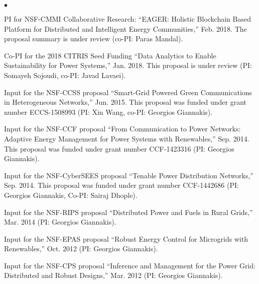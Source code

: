 \documentclass[margin,line]{res}
\newenvironment{list2}{
  \begin{list}{$\bullet$}{%
      \setlength{\itemsep}{0in}
      \setlength{\parsep}{0in} \setlength{\parskip}{0in}
      \setlength{\topsep}{0in} \setlength{\partopsep}{0in}
      \setlength{\leftmargin}{0.10in}}}{\end{list}}
\begin{document}
\begin{resume}
\begin{list2}
\item   PI for NSF-CMMI Collaborative Research: ``EAGER: Holistic Blockchain Based Platform for
Distributed and Intelligent Energy Communities,'' Feb. 2018. The proposal summary is under review (co-PI: Paras Mandal).


\item   Co-PI for the 2018 CITRIS Seed Funding ``Data Analytics to Enable Sustainability for Power Systems,'' Jan. 2018. This proposal is under review (PI: Somayeh Sojoudi, co-PI: Javad Lavaei).
        
\item   Input for the NSF-CCSS proposal ``Smart-Grid Powered Green Communications
        in Heterogeneous Networks,'' Jun. 2015.
        This proposal was funded under grant number ECCS-1508993 (PI: Xin Wang, co-PI: Georgios Giannakis).

\item   Input for the NSF-CCF proposal ``From Communication to Power Networks:
        Adaptive Energy Management for Power Systems with Renewables,'' Sep. 2014.
        This proposal was funded under grant number CCF-1423316 (PI: Georgios Giannakis).

\item   Input for the NSF-CyberSEES proposal ``Tenable Power Distribution Networks,'' Sep. 2014.
        This proposal was funded under grant number CCF-1442686 (PI: Georgios Giannakis, Co-PI: Sairaj Dhople).

\item   Input for the NSF-RIPS proposal ``Distributed Power and Fuels in Rural Grids,''
        Mar. 2014 (PI: Georgios Giannakis).

\item   Input for the NSF-EPAS proposal ``Robust Energy Control for Microgrids with Renewables,''
        Oct. 2012 (PI: Georgios Giannakis).

\item   Input for the NSF-CPS proposal ``Inference and Management for the Power Grid: Distributed and Robust Designs,''
        Mar. 2012 (PI: Georgios Giannakis).
\end{list2}

\vspace{.3cm}


\end{resume}
\end{document}
